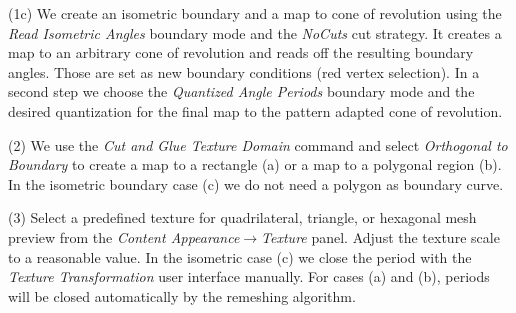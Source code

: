\documentclass[Thesis.tex]{subfiles}
\begin{document}
\begin{compactenum}[(1)]
\begin{center}
\begin{minipage}{0.9\linewidth}
            \centering
\end{minipage}
\end{center}

\item[(1c)] We create an isometric boundary and a map to cone of revolution using the \emph{Read Isometric Angles} boundary mode and the \emph{NoCuts} cut strategy. It creates a map to an arbitrary cone of revolution and reads off the resulting boundary angles. Those are set as new boundary conditions (red vertex selection). In a second step we choose the \emph{Quantized Angle Periods} boundary mode and the desired quantization for the final map to the pattern adapted cone of revolution.

\begin{center}
\begin{minipage}{0.9\linewidth}
            \centering
\end{minipage}
\end{center}    

\item[(2)] We use the \emph{Cut and Glue Texture Domain} command and select \emph{Orthogonal to Boundary} to create a map to a rectangle (a) or a map to a polygonal region (b). In the isometric boundary case (c) we do not need a polygon as boundary curve.
\item[(3)] Select a predefined texture for quadrilateral, triangle, or hexagonal mesh preview from the \emph{Content Appearance$\to$Texture} panel. Adjust the texture scale to a reasonable value. In the isometric case (c) we close the period with the \emph{Texture Transformation} user interface manually. For cases (a) and (b), periods will be closed automatically by the remeshing algorithm.


\end{compactenum}
\end{document}
